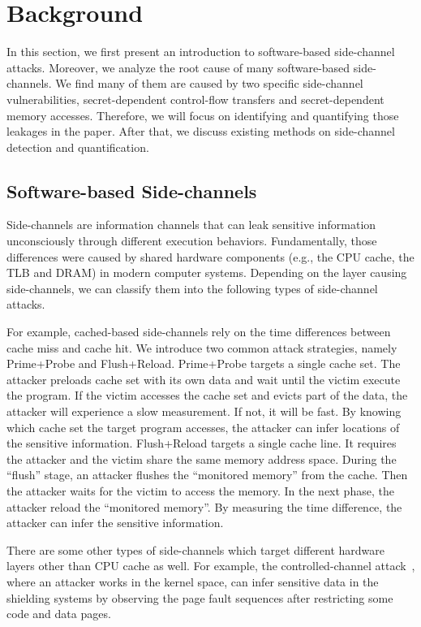 \section{Background}
In this section, we first present an introduction to software-based 
side-channel attacks. Moreover, we analyze the root cause of many
software-based side-channels. We find many of them are caused by
two specific side-channel vulnerabilities, secret-dependent control-flow transfers and
secret-dependent memory accesses. Therefore, we will focus on identifying
and quantifying those leakages in the paper. After that, we 
discuss existing methods on side-channel detection and quantification.

\subsection{Software-based Side-channels}
Side-channels are information channels that can leak sensitive information 
unconsciously through different execution behaviors.  Fundamentally, those 
differences were caused by shared hardware
components (e.g., the CPU cache, the TLB and DRAM) in modern computer systems.
Depending on the layer causing side-channels, we can classify them 
into the following types of side-channel attacks.

For example, cached-based side-channels rely on the time differences 
between cache miss and cache hit. We introduce two common attack strategies,
namely Prime+Probe and Flush+Reload.
Prime+Probe targets a single cache set. The attacker preloads cache set with
its own data and wait until the victim execute the program.
If the victim accesses the cache set and evicts part of 
the data, the attacker will experience a slow measurement. If not, 
it will be fast. By knowing which cache set the target
program accesses, the attacker can infer locations of
the sensitive information. Flush+Reload targets a single cache line. 
It requires the attacker and the victim share the same memory address space.
During the ``flush'' stage, an attacker 
flushes the ``monitored memory'' from the cache. Then the attacker
waits for the victim to access the memory. In the next phase, the 
attacker reload the ``monitored memory''. By measuring the time difference, the
attacker can infer the sensitive information.

There are some other types of side-channels which target different hardware layers other than  
CPU cache as well.
For example, the controlled-channel attack~\cite{7163052},
where an attacker works in the kernel space, can infer sensitive data in the shielding systems by
observing the page fault sequences after restricting some code and
data pages. 

